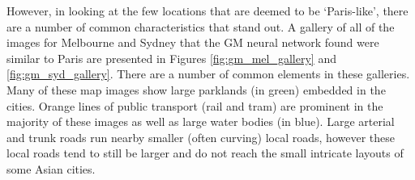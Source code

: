 \documentclass[sageh,times]{sagej}
\begin{document}
However, in looking at the few locations that are deemed to be `Paris-like', there are a number of common characteristics that stand out. A gallery of all of the images for Melbourne and Sydney that the GM neural network found were similar to Paris are presented in Figures \ref{fig:gm_mel_gallery} and \ref{fig:gm_syd_gallery}. There are a number of common elements in these galleries. Many of these map images show large parklands (in green) embedded in the cities. Orange lines of public transport (rail and tram) are prominent in the majority of these images as well as large water bodies (in blue). Large arterial and trunk roads run nearby smaller (often curving) local roads, however these local roads tend to still be larger and do not reach the small intricate layouts of some Asian cities.
\end{document}
